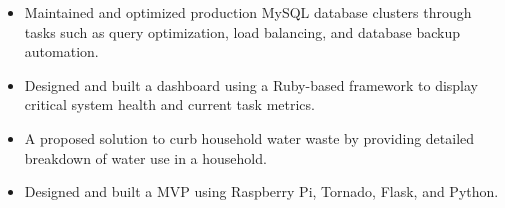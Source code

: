 \documentclass[10pt,a4paper,academicons]{altacv}
\begin{document}
\divider

\begin{itemize}
\item Maintained and optimized production MySQL database clusters through tasks such as query optimization, load balancing, and database backup automation.
\item Designed and built a dashboard using a Ruby-based framework to display critical system health and current task metrics.
\end{itemize}


\begin{itemize}
\item A proposed solution to curb household water waste by providing detailed breakdown of water use in a household.
\item Designed and built a MVP using Raspberry Pi, Tornado, Flask, and Python.
\end{itemize}
\end{document}
